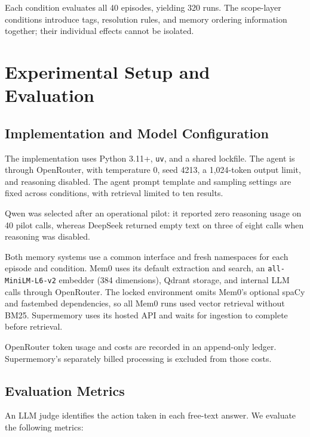 \documentclass[11pt,a4paper]{article}
\begin{document}
Each condition evaluates all 40 episodes, yielding
320 runs. The scope-layer conditions introduce tags,
resolution rules, and memory ordering information
together; their individual effects cannot be isolated.

\section{Experimental Setup and Evaluation}
\label{sec:experimental-setup}

\subsection{Implementation and Model Configuration}

The implementation uses Python 3.11+, \texttt{uv}, and
a shared lockfile. The agent is
 through OpenRouter, with
temperature 0, seed 4213, a 1,024-token output limit,
and reasoning disabled. The agent prompt template and
sampling settings are fixed across conditions, with
retrieval limited to ten results.

Qwen was selected after an operational pilot: it
reported zero reasoning usage on 40 pilot calls,
whereas DeepSeek returned empty text on three of
eight calls when reasoning was disabled.

Both memory systems use a common interface and fresh
namespaces for each episode and condition. Mem0 uses
its default extraction and search, an
\texttt{all-MiniLM-L6-v2} embedder (384 dimensions),
Qdrant storage, and internal LLM calls through
OpenRouter. The locked environment omits Mem0's optional
spaCy and fastembed dependencies, so all Mem0 runs used
vector retrieval without BM25. Supermemory uses its hosted API
and waits for ingestion to complete before retrieval.

OpenRouter token usage and costs are recorded in an
append-only ledger. Supermemory's separately billed
processing is excluded from those costs.

\subsection{Evaluation Metrics}
\label{sec:metrics}

An LLM judge identifies the action taken in each
free-text answer. We evaluate the following metrics:
\end{document}
